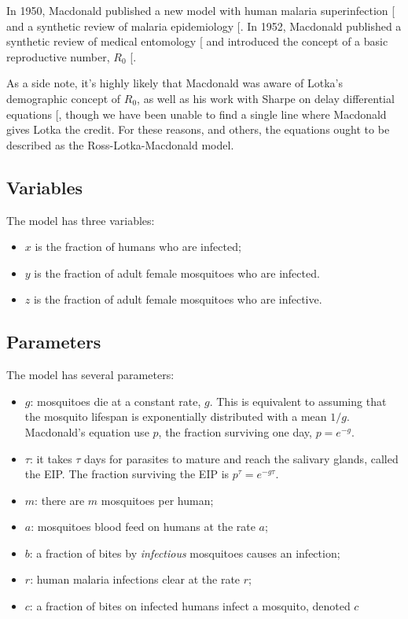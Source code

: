 \documentclass[
]{book}
\begin{document}
In 1950, Macdonald published a new model with human malaria superinfection {[}\citeproc{ref-MacdonaldG1950Superinfection}{60}{]} and a synthetic review of malaria epidemiology {[}\citeproc{ref-MacdonaldG1950Epidemiology}{59}{]}. In 1952, Macdonald published a synthetic review of medical entomology {[}\citeproc{ref-MacdonaldG1952Sporozoite}{38}{]} and introduced the concept of a basic reproductive number, \(R_0\) {[}\citeproc{ref-MacdonaldG1952R0}{39}{]}.

As a side note, it's highly likely that Macdonald was aware of Lotka's demographic concept of \(R_0\), as well as his work with Sharpe on delay differential equations {[}\citeproc{ref-LotkaAJ1923part4}{63}{]}, though we have been unable to find a single line where Macdonald gives Lotka the credit. For these reasons, and others, the equations ought to be described as the Ross-Lotka-Macdonald model.

\subsection{Variables}\label{variables-1}

The model has three variables:

\begin{itemize}
\item
  \(x\) is the fraction of humans who are infected;
\item
  \(y\) is the fraction of adult female mosquitoes who are infected.
\item
  \(z\) is the fraction of adult female mosquitoes who are infective.
\end{itemize}

\subsection{Parameters}\label{parameters-2}

The model has several parameters:

\begin{itemize}
\item
  \(g\): mosquitoes die at a constant rate, \(g\). This is equivalent to assuming that the mosquito lifespan is exponentially distributed with a mean \(1/g\). Macdonald's equation use \(p\), the fraction surviving one day, \(p = e^{-g}\).
\item
  \(\tau\): it takes \(\tau\) days for parasites to mature and reach the salivary glands, called the EIP. The fraction surviving the EIP is \(p^\tau = e^{-g \tau}\).
\item
  \(m\): there are \(m\) mosquitoes per human;
\item
  \(a\): mosquitoes blood feed on humans at the rate \(a\);
\item
  \(b\): a fraction of bites by \emph{infectious} mosquitoes causes an infection;
\item
  \(r\): human malaria infections clear at the rate \(r\);
\item
  \(c\): a fraction of bites on infected humans infect a mosquito, denoted \(c\)
\end{itemize}
\end{document}

